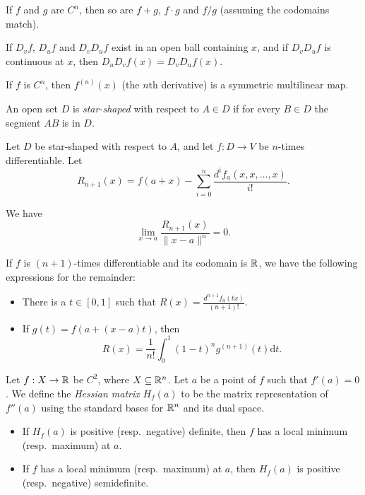 \begin{prop}
    If $f$ and $g$ are $C^n$, then so are $f+g$, $f\cdot g$ and $f/g$ (assuming
    the codomains match).
\end{prop}
\begin{prop}
    If $D_v f$, $D_u f$ and $D_v D_u f$ exist in an open ball containing $x$,
    and if $D_v D_u f$ is continuous at $x$, then $D_u D_v f(x)=D_v D_u f(x)$.
\end{prop}
\begin{cor}
    If $f$ is $C^n$, then $f^{(n)}(x)$ (the $n$th derivative) is a symmetric
    multilinear map.
\end{cor}
\begin{defn}
    An open set $D$ is \emph{star-shaped} with respect to $A\in D$ if
    for every $B\in D$ the segment $AB$ is in $D$.
\end{defn}
\begin{thm}[Taylor]
    Let $D$ be star-shaped with respect to $A$, and let $f:D\to V$ be $n$-times
    differentiable. Let \[R_{n+1}(x)=f(a+x)-\sum_{i=0}^n \frac{d^i
    f_a(x,x,\ldots,x)}{i!}.\]

    We have \[\lim_{x\to a}\frac{R_{n+1}(x)}{\|x-a\|^n}=0.\] 

    If $f$ is $(n+1)$-times differentiable and its codomain is $\mathbb{R}$,
    we have the following expressions for the remainder:
    \begin{itemize}
        \item There is a $t\in[0,1]$ such that
            $R(x)=\frac{d^{n+1}f_a(tx)}{(n+1)!}$.
        \item If $g(t)=f(a+(x-a)t)$, then
            \[R(x)=\frac 1{n!}\int_0^1 (1-t)^n g^{(n+1)}(t)\mathrm dt.\]
    \end{itemize}
\end{thm}
\begin{prop}
    Let $f:X\to\mathbb{R}$ be $C^2$, where $X\subseteq\mathbb{R}^n$.
    Let $a$ be a point of $f$ such that $f'(a)=0$.
    We define the \emph{Hessian matrix} $H_f(a)$ to be the matrix representation
    of $f''(a)$ using the standard bases for $\mathbb{R}^n$ and its dual space.
    \begin{itemize}
        \item If $H_f(a)$ is positive (resp.\ negative) definite, then $f$ has a
            local minimum (resp.\ maximum) at $a$.
        \item If $f$ has a local minimum (resp.\ maximum) at $a$, then $H_f(a)$
            is positive (resp.\ negative) semidefinite.
    \end{itemize}
\end{prop}
